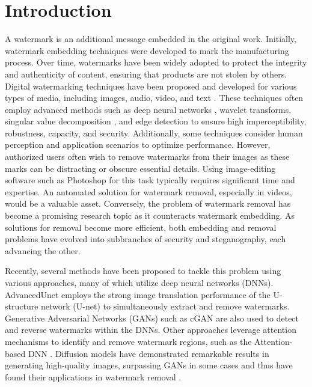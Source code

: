 \chapter{Introduction}
\thispagestyle{empty}
\label{chapter:intro}
A watermark is an additional message embedded in the original work. Initially, watermark embedding techniques were developed to mark the manufacturing process. Over time, watermarks have been widely adopted to protect the integrity and authenticity of content, ensuring that products are not stolen by others. Digital watermarking techniques have been proposed and developed for various types of media, including images, audio, video, and text \cite{cox2007digital}. These techniques often employ advanced methods such as deep neural networks \cite{luo2023dvmark}, wavelet transforms, singular value decomposition \cite{ernawan2020block}, and edge detection \cite{kadian2021robust} to ensure high imperceptibility, robustness, capacity, and security. Additionally, some techniques consider human perception and application scenarios to optimize performance. However, authorized users often wish to remove watermarks from their images as these marks can be distracting or obscure essential details. Using image-editing software such as Photoshop for this task typically requires significant time and expertise. An automated solution for watermark removal, especially in videos, would be a valuable asset. Conversely, the problem of watermark removal has become a promising research topic as it counteracts watermark embedding. As solutions for removal become more efficient, both embedding and removal problems have evolved into subbranches of security and steganography, each advancing the other. 

Recently, several methods have been proposed to tackle this problem using various approaches, many of which utilize deep neural networks (DNNs). AdvancedUnet \cite{wei2023visual} employs the strong image translation performance of the U-structure network (U-net) to simultaneously extract and remove watermarks. Generative Adversarial Networks (GANs) such as cGAN \cite{liu2021wdnet, sun2021detect} are also used to detect and reverse watermarks within the DNNs. Other approaches leverage attention mechanisms to identify and remove watermark regions, such as the Attention-based DNN \cite{zhang2021blind}. Diffusion models have demonstrated remarkable results in generating high-quality images, surpassing GANs in some cases \cite{dhariwal2021diffusion} and thus have found their applications in watermark removal \cite{li2023diffwa}.


